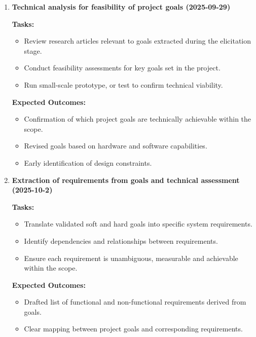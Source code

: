 \documentclass[12pt]{article}
\theoremstyle{definition}
\begin{document}
\begin{enumerate}
  \vspace{0.8em}

  \item \textbf{Technical analysis for feasibility of project goals
  (2025-09-29)}  

  \textbf{Tasks:}
  \begin{itemize}
      \item Review research articles relevant to goals extracted during the
      elicitation stage. 
      \item Conduct feasibility assessments for key goals set in the project. 
      \item Run small-scale prototype, or test to confirm technical viability. 
  \end{itemize}

  \textbf{Expected Outcomes:}
  \begin{itemize}
      \item Confirmation of which project goals are technically achievable
      within the scope.
      \item Revised goals based on hardware and software capabilities. 
      \item Early identification of design constraints. 
  \end{itemize}

  \vspace{0.8em}

  \item \textbf{Extraction of requirements from goals and technical assessment
  (2025-10-2)}

  \textbf{Tasks:}
  \begin{itemize}
      \item Translate validated soft and hard goals into specific system
      requirements. 
      \item Identify dependencies and relationships between requirements. 
      \item Ensure each requirement is unambiguous, measurable and achievable
      within the scope. 
  \end{itemize}

  \textbf{Expected Outcomes:}
  \begin{itemize}
      \item Drafted list of functional and non-functional requirements derived
      from goals. 
      \item Clear mapping between project goals and corresponding requirements. 
  \end{itemize}


\end{enumerate}
\end{document}
